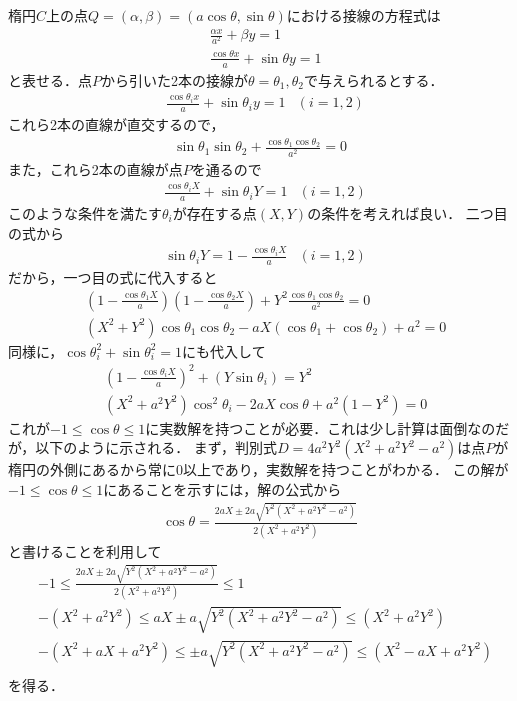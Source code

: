\documentclass[a4paper,10pt]{ltjsarticle}
\begin{document}
\begin{multicols}{2}
楕円$C$上の点$Q=(\alpha,\beta)=(a\cos\theta,\sin\theta)$における接線の方程式は
\begin{align*}
  &\frac{\alpha x}{a^2} + \beta y = 1 \\
  &\frac{\cos\theta x}{a} + \sin\theta y = 1 
\end{align*}
と表せる．点$P$から引いた2本の接線が$\theta=\theta_1, \theta_2$で与えられるとする．
\begin{align*}
  & \frac{\cos\theta_{i} x}{a} + \sin\theta_{i} y = 1  & (i = 1,2)
\end{align*}
これら2本の直線が直交するので，
\begin{align}
  \sin\theta_1\sin\theta_2 + \frac{\cos\theta_1\cos\theta_2}{a^2} = 0 
\end{align}
また，これら2本の直線が点$P$を通るので
\begin{align}
  & \frac{\cos\theta_{i} X}{a} + \sin\theta_{i} Y = 1  & (i = 1,2)
\end{align}
このような条件を満たす$\theta_i$が存在する点$(X,Y)$の条件を考えれば良い．
二つ目の式から
\begin{align}
  & \sin\theta_{i} Y = 1 - \frac{\cos\theta_{i} X}{a}  & (i = 1,2)
\end{align}
だから，一つ目の式に代入すると
\begin{align}
  &\left(1 - \frac{\cos\theta_{1} X}{a} \right)\left(1 - \frac{\cos\theta_{2} X}{a} \right) +Y^2\frac{\cos\theta_1\cos\theta_2}{a^2} = 0 \\
  &\left(X^2+Y^2\right)\cos\theta_1\cos\theta_2 -aX(\cos\theta_1+\cos\theta_2) + a^2 = 0
\end{align}
同様に，$\cos\theta_{i}^2+\sin\theta_{i}^2=1$にも代入して
\begin{align}
  &\left(1 - \frac{\cos\theta_{i} X}{a} \right)^2+\left(Y\sin\theta_{i}\right) = Y^2 \\
  &\left(X^2+a^2Y^2\right)\cos^2\theta_{i} - 2aX\cos\theta + a^2\left(1-Y^2\right) = 0
\end{align}
これが$-1\le\cos\theta\le 1$に実数解を持つことが必要．これは少し計算は面倒なのだが，以下のように示される．
まず，判別式$D=4a^2Y^2(X^2+a^2Y^2-a^2)$は点$P$が楕円の外側にあるから常に$0$以上であり，実数解を持つことがわかる．
この解が$-1\le\cos\theta\le 1$にあることを示すには，解の公式から
\begin{align*}
  \cos\theta = \frac{2aX\pm 2a\sqrt{Y^2(X^2+a^2Y^2-a^2)}}{2(X^2+a^2Y^2)}
\end{align*}
と書けることを利用して
\begin{align*}
  &-1 \le  \frac{2aX\pm 2a\sqrt{Y^2(X^2+a^2Y^2-a^2)}}{2(X^2+a^2Y^2)} \le 1 \\
  &-(X^2+a^2Y^2) \le aX\pm a\sqrt{Y^2(X^2+a^2Y^2-a^2)} \le (X^2+a^2Y^2) \\
  &-(X^2+aX+a^2Y^2) \le \pm a\sqrt{Y^2(X^2+a^2Y^2-a^2)} \le (X^2-aX + a^2Y^2) \\
\end{align*}
を得る．


\end{multicols}
\end{document}
